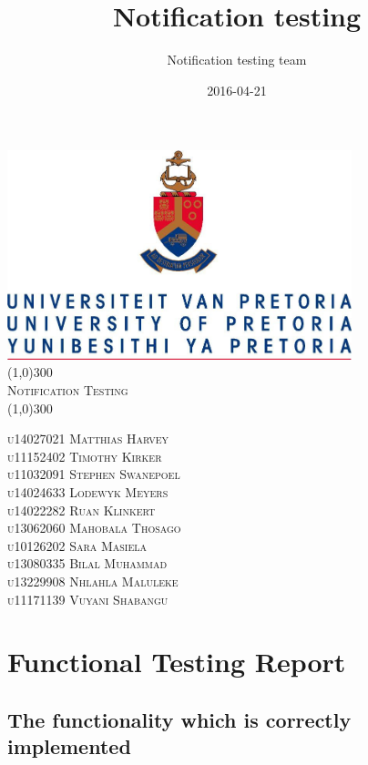 \documentclass{article}
\title{Notification testing}
\date{2016-04-21}
\author{Notification testing team}
\begin{document}
\begin{titlepage}
	\begin{center}
		\includegraphics[width=10cm]{UP.jpg}  \\
		[1cm]
		\line(1,0){300} \\
		[0.4cm]
		\textsc{\huge
			Notification Testing
		} \\
		[0.1cm]
		\line(1,0){300} \\
		[1cm]

	\end{center}
	\begin{flushleft}
	\textsc{\Large
		u14027021 Matthias Harvey\\
		u11152402 Timothy Kirker\\
		u11032091 Stephen Swanepoel\\
		u14024633 Lodewyk Meyers\\
		u14022282 Ruan Klinkert\\
		u13062060 Mahobala Thosago\\
		u10126202 Sara Masiela\\
		u13080335 Bilal Muhammad\\
		u13229908 Nhlahla Maluleke\\
		u11171139 Vuyani Shabangu\\
	}
	\end{flushleft}
\end{titlepage}

\tableofcontents
\thispagestyle{empty}
\cleardoublepage

\setcounter{page}{1}

\section{Functional Testing Report}
\subsection{The functionality which is correctly implemented}
\end{document}
